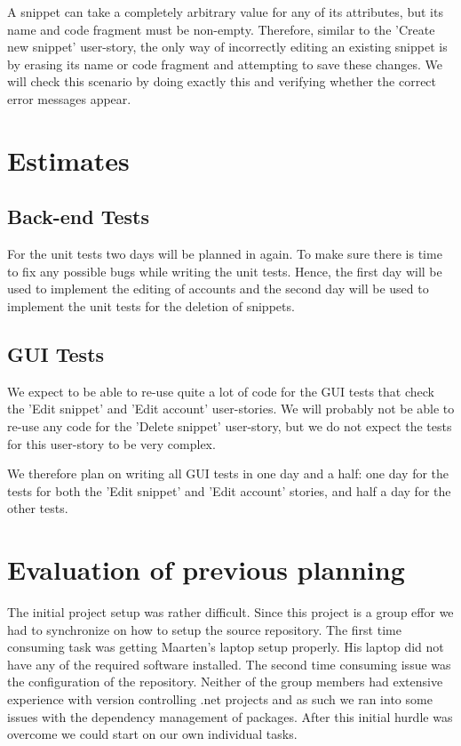 \documentclass[10pt,a4paper,BCOR12mm, headexclude, footexclude,
  twoside, openright]{scrartcl}
\numberwithin{equation}{section} %
\numberwithin{figure}{section} %
\numberwithin{table}{section} %
\begin{document}
A snippet can take a completely arbitrary value for any of its attributes, but its name and code fragment must be non-empty.
Therefore, similar to the 'Create new snippet' user-story, the only way of incorrectly editing an existing snippet is by erasing its name or code fragment and attempting to save these changes.
We will check this scenario by doing exactly this and verifying whether the correct error messages appear.


\section{Estimates}
\subsection{Back-end Tests}
For the unit tests two days will be planned in again. To make sure there is time
to fix any possible bugs while writing the unit tests. Hence, the first day will be
used to implement the editing of accounts and the second day will be used to
implement the unit tests for the deletion of snippets.
\subsection{GUI Tests}
We expect to be able to re-use quite a lot of code for the GUI tests that check the 'Edit snippet' and 'Edit account' user-stories.
We will probably not be able to re-use any code for the 'Delete snippet' user-story, but we do not expect the tests for this user-story to be very complex.

We therefore plan on writing all GUI tests in one day and a half: one day for the tests for both the 'Edit snippet' and 'Edit account' stories, and half a day for the other tests.

\section{Evaluation of previous planning}
The initial project setup was rather difficult. Since this project is a group
effor we had to synchronize on how to setup the source repository. The first
time consuming task was getting Maarten's laptop setup properly. His laptop did
not have any of the required software installed. The second time consuming issue
was the configuration of the repository. Neither of the group members had
extensive experience with version controlling .net projects and as such we ran
into some issues with the dependency management of packages. After this initial
hurdle was overcome we could start on our own individual tasks.
\end{document}
